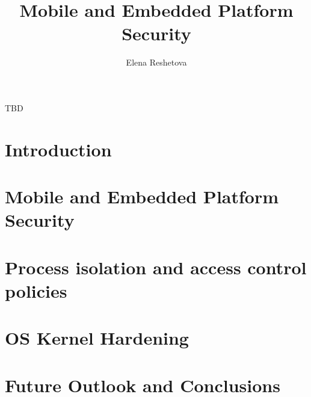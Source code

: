 \documentclass[dissertation,math,vertlayout]{aaltoseries}
\author{Elena Reshetova}
\title{Mobile and Embedded Platform Security}
\begin{document}


\begin{preface}[Sipoo]
TBD
\end{preface}

\clearpage
\tableofcontents


\listofpublications



\chapter{Introduction}
\label{sec:introduction}
                

\chapter{Mobile and Embedded Platform Security}
\label{sec:plat-sec}
 


\chapter{Process isolation and access control policies}
\label{sec:ac-policies}
 

\chapter{OS Kernel Hardening}
\label{sec:kernel-hardening}
 

\chapter{Future Outlook and Conclusions}
\label{sec:discussion}
 

\renewcommand{\bibname}{References}
\end{document}
